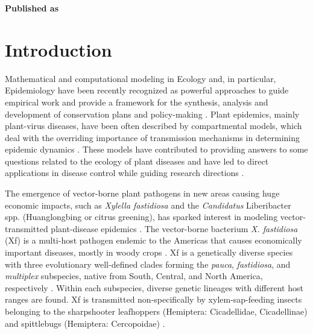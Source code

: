 \vspace{3cm}





\textbf{Published as}

\vspace{0.5cm}


\newpage
\section{Introduction}

Mathematical and computational modeling in Ecology and, in particular,
Epidemiology have been recently recognized as powerful approaches to guide
empirical work and provide a framework for the synthesis, analysis and
development of conservation plans and policy-making
\cite{levin1992mathematics,Murray_book,sarkar2006biodiversity,Chew2014}.
Plant epidemics, mainly plant-virus diseases, have been often described by
compartmental models, which deal with the overriding importance of transmission
mechanisms in determining epidemic dynamics
\cite{Jeger1998,Jeger2004,Madden2000}. These models have contributed to
providing answers to some questions related to the ecology of plant diseases
and have led to direct applications in disease control while guiding research
directions \cite{Jeger2019}.

The emergence of vector-borne plant pathogens in new areas causing huge
economic impacts, such as \textit{Xylella fastidiosa} and the
\textit{Candidatus} Liberibacter spp. (Huanglongbing or citrus greening), has
sparked interest in modeling vector-transmitted plant-disease epidemics
\cite{chiyaka2012modeling,Jeger2019}. The vector-borne bacterium \textit{X.
    fastidiosa} (Xf) is a multi-host pathogen endemic to the Americas that
causes
economically important diseases, mostly in woody crops \cite{Hopkins2002}. Xf
is a genetically diverse species with three evolutionary well-defined clades
forming the \textit{pauca}, \textit{fastidiosa}, and \textit{multiplex}
subspecies, native from South, Central, and North America, respectively
\cite{Vanhove2019}. Within each subspecies, diverse genetic lineages
with different host ranges are found. Xf is transmitted non-specifically by
xylem-sap-feeding insects belonging to the sharpshooter leafhoppers (Hemiptera:
Cicadellidae, Cicadellinae) and spittlebugs (Hemiptera: Cercopoidae)
\cite{Redak2004}.

